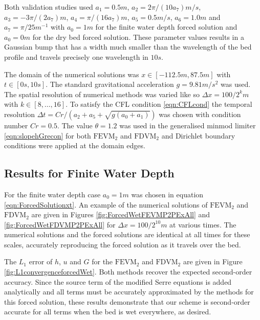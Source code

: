 Both validation studies used $a_1 = 0.5m$, $a_2 = 2 \pi / \left(10 a_7\right) m/s$, $a_3 = - 3\pi/ \left(2 a_7\right) m$, $a_4 = \pi / (16 a_7) m$, $a_5 = 0.5 m/s$, $a_6 = 1.0 m$ and $a_7 = \pi / 25 m^{-1}$ with $a_0= 1m$ for the finite water depth forced solution and $a_0=0m$ for the dry bed forced solution. These parameter values results in a Gaussian bump that has a width much smaller than the wavelength of the bed profile and travels precisely one wavelength in $10s$.

The domain of the numerical solutions was $x \in \left[-112.5 m,87.5 m\right]$ with $t \in \left[0s,10s\right]$. The standard gravitational acceleration $g= 9.81 m/s^2$ was used. The spatial resolution of numerical methods was varied like so $\Delta x = 100 / 2^k m$ with $k \in \left[8,\dots,16\right]$. To satisfy the CFL condition \eqref{eqn:CFLcond} the temporal resolution
$\Delta t = Cr / \left(a_2 + a_5 + \sqrt{g\left(a_0 + a_1\right)}\right)$ was chosen with condition number $Cr = 0.5$. The value $\theta = 1.2$ was used in the generalised minmod limiter \eqref{eqn:slopehGrecon} for both $\text{FEVM}_2$ and $\text{FDVM}_2$ and Dirichlet boundary conditions were applied at the domain edges. 


\subsection{Results for Finite Water Depth} 
For the finite water depth case $a_0 = 1m$ was chosen in equation \eqref{eqn:ForcedSolutionxt}. An example of the numerical solutions of $\text{FEVM}_2$ and $\text{FDVM}_2$ are given in Figures \ref{fig:ForcedWetFEVMP2PExAll} and \ref{fig:ForcedWetFDVMP2PExAll} for $\Delta x = 100/ 2^{10} m$ at various times. The numerical solutions and the forced solutions are identical at all times for these scales, accurately reproducing the forced solution as it travels over the bed.

The $L_1$ error of $h$, $u$ and $G$ for the $\text{FEVM}_2$ and $\text{FDVM}_2$ are given in Figure \ref{fig:L1convergenceforcedWet}. Both methods recover the expected second-order accuracy. Since the source term of the modified Serre equations is added analytically and all terms must be accurately approximated by the methods for this forced solution, these results demonstrate that our scheme is second-order accurate for all terms when the bed is wet everywhere, as desired.

